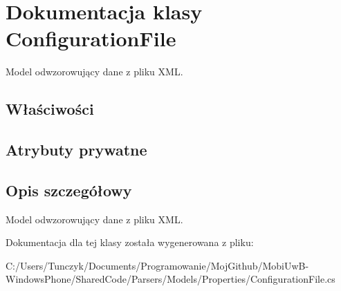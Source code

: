 \hypertarget{a00012}{}\section{Dokumentacja klasy Configuration\+File}
\label{a00012}


Model odwzorowujący dane z pliku X\+M\+L.  


\subsection*{Właściwości}
\subsection*{Atrybuty prywatne}


\subsection{Opis szczegółowy}
Model odwzorowujący dane z pliku X\+M\+L. 



Dokumentacja dla tej klasy została wygenerowana z pliku\+:\begin{DoxyCompactItemize}
\item 
C\+:/\+Users/\+Tunczyk/\+Documents/\+Programowanie/\+Moj\+Github/\+Mobi\+Uw\+B-\/\+Windows\+Phone/\+Shared\+Code/\+Parsers/\+Models/\+Properties/Configuration\+File.\+cs\end{DoxyCompactItemize}

